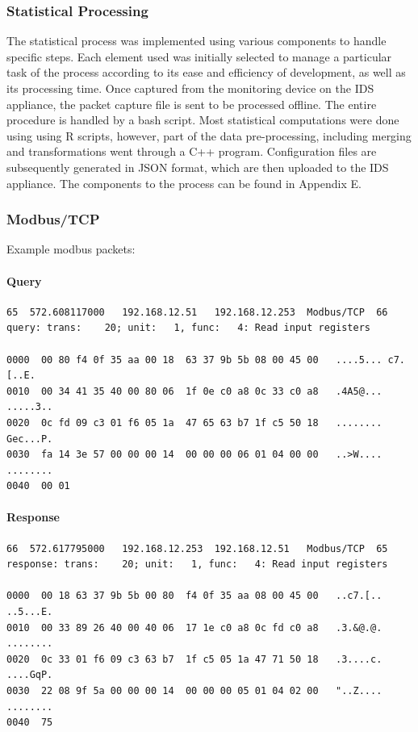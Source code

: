 \documentclass[12pt,]{article}
\begin{document}
\subsubsection{Statistical Processing}\label{statistical-processing}

The statistical process was implemented using various components to
handle specific steps. Each element used was initially selected to
manage a particular task of the process according to its ease and
efficiency of development, as well as its processing time. Once captured
from the monitoring device on the IDS appliance, the packet capture file
is sent to be processed offline. The entire procedure is handled by a
bash script. Most statistical computations were done using using R
scripts, however, part of the data pre-processing, including merging and
transformations went through a C++ program. Configuration files are
subsequently generated in JSON format, which are then uploaded to the
IDS appliance. The components to the process can be found in Appendix E.

\subsubsection{Modbus/TCP}\label{modbustcp-1}

Example modbus packets:

\paragraph{Query}\label{query}

\begin{verbatim}
65  572.608117000   192.168.12.51   192.168.12.253  Modbus/TCP  66
query: trans:    20; unit:   1, func:   4: Read input registers

0000  00 80 f4 0f 35 aa 00 18  63 37 9b 5b 08 00 45 00   ....5... c7.[..E.
0010  00 34 41 35 40 00 80 06  1f 0e c0 a8 0c 33 c0 a8   .4A5@... .....3..
0020  0c fd 09 c3 01 f6 05 1a  47 65 63 b7 1f c5 50 18   ........ Gec...P.
0030  fa 14 3e 57 00 00 00 14  00 00 00 06 01 04 00 00   ..>W.... ........
0040  00 01    
\end{verbatim}

\paragraph{Response}\label{response}

\begin{verbatim}
66  572.617795000   192.168.12.253  192.168.12.51   Modbus/TCP  65
response: trans:    20; unit:   1, func:   4: Read input registers

0000  00 18 63 37 9b 5b 00 80  f4 0f 35 aa 08 00 45 00   ..c7.[.. ..5...E.
0010  00 33 89 26 40 00 40 06  17 1e c0 a8 0c fd c0 a8   .3.&@.@. ........
0020  0c 33 01 f6 09 c3 63 b7  1f c5 05 1a 47 71 50 18   .3....c. ....GqP.
0030  22 08 9f 5a 00 00 00 14  00 00 00 05 01 04 02 00   "..Z.... ........
0040  75
\end{verbatim}
\end{document}
